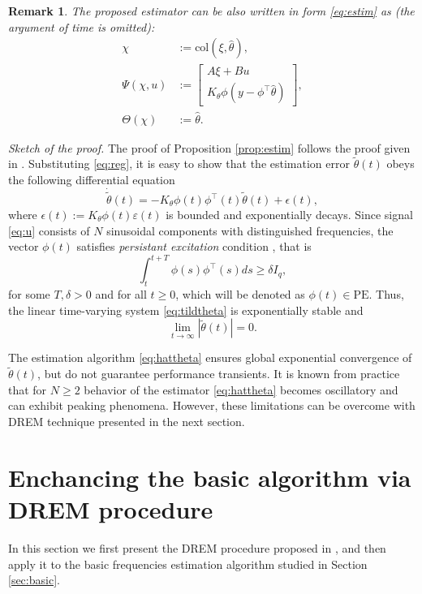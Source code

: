 \documentclass[journal, onecolumn]{IEEEtran}
\newtheorem{remark}{Remark}
\newcommand{\col}[1]{\mathrm{col}(#1)}
\newcommand{\hth}{\hat{\theta}}
\newcommand{\tth}{\tilde{\theta}}
\begin{document}
\begin{remark}
	The proposed estimator can be also written in form \eqref{eq:estim} as (the argument of time is omitted):
	\begin{align*}
		\chi &:= \col{\xi, \hth}, \\
		\Psi(\chi, u) &:= \begin{bmatrix}
		A\xi+Bu \\ 
		K_\theta\phi(y - \phi^\top\hth)
		\end{bmatrix}, \\
		\Theta(\chi) &:= \hth.
	\end{align*}
\end{remark}

\emph{Sketch of the proof.} The proof of Proposition \ref{prop:estim} follows the proof given in \cite{pyrkin2015estimation}. Substituting \eqref{eq:reg}, it is easy to show that the estimation error $\tth(t)$ obeys the following differential equation
\begin{equation} \label{eq:tildtheta}
	\dot{\tth}(t) = -K_\theta \phi(t)\phi^\top(t)\tth(t) + \epsilon(t),
\end{equation}
where $\epsilon(t):=K_\theta\phi(t)\varepsilon(t)$ is bounded and exponentially decays. Since signal \eqref{eq:u} consists of $N$ sinusoidal components with distinguished frequencies, the vector $\phi(t)$ satisfies \emph{persistant excitation} condition \cite{sastry2011adaptive}, that is 
\[
	\int_t^{t+T} \phi(s) \phi^\top(s)ds \geq \delta I_q,
\]
for some $T,\delta >0$ and for all $t \geq 0$, which will be denoted as $\phi(t) \in \mbox{PE}$. Thus, the linear time-varying system \eqref{eq:tildtheta} is exponentially stable and 
\[
	\lim_{t\to\infty}|\tth(t)|=0. 
\] 

The estimation algorithm \eqref{eq:hattheta} ensures global exponential convergence of $\tth(t)$, but do not guarantee performance transients. It is known from practice that for $N\ge2$ behavior of the estimator \eqref{eq:hattheta} becomes oscillatory and can exhibit peaking phenomena. However, these limitations can be overcome with DREM technique presented in the next section.

\section{Enchancing the basic algorithm via DREM procedure} \label{sec:DREM}
In this section we first present the DREM procedure proposed in \cite{Aranovskiy2015DREM}, and then apply it to the basic frequencies estimation algorithm studied in Section \ref{sec:basic}.
\end{document}

